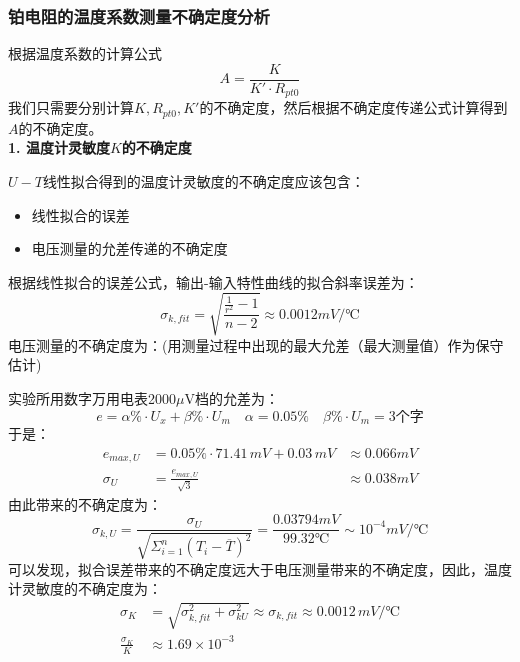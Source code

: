 \documentclass[12pt]{article}
\begin{document}
\subsubsection{铂电阻的温度系数测量不确定度分析}
\quad 根据温度系数的计算公式
\[
    A=\frac{K}{K' \cdot R_{pt0}}
\]
\quad 我们只需要分别计算$K,R_{pt0},K'$的不确定度，然后根据不确定度传递公式计算得到$A$的不确定度。\\
\textbf{1. 温度计灵敏度$K$的不确定度} \\
\par 
$U-T$线性拟合得到的温度计灵敏度的不确定度应该包含：
\begin{itemize}
    \item 线性拟合的误差
    \item 电压测量的允差传递的不确定度
\end{itemize}
\quad 根据线性拟合的误差公式，输出-输入特性曲线的拟合斜率误差为：
\begin{equation*}
    \sigma_{k,fit} = \sqrt{\frac{\frac{1}{r^2}-1}{n-2}} \approx 0.0012 mV/\text{℃}
\end{equation*}
\quad 电压测量的不确定度为：(用测量过程中出现的最大允差（最大测量值）作为保守估计)\\
\par
 实验所用数字万用电表2000$\mu$V档的允差为：
\begin{equation*}
    e=\alpha\%\cdot U_{x} + \beta \% \cdot U_m \quad \alpha=0.05\% \quad \beta \% \cdot U_m=3\text{个字}
\end{equation*}
\quad 于是：
\begin{equation*}
\begin{aligned}
    e_{max,U} &= 0.05\%\cdot 71.41\,mV + 0.03\,mV &\approx 0.066 mV \\
    \sigma_{U} &= \frac{e_{max,U}}{\sqrt{3}} &\approx 0.038 mV 
\end{aligned}
\end{equation*}
\quad 由此带来的不确定度为：
\begin{equation*}
    \sigma_{k,U} = \frac{\sigma_{U}}{\sqrt{\Sigma_{i=1}^{n} (T_i-\overline T)^2}}= \frac{0.03794 mV}{99.32\text{℃}} \sim 10^{-4} mV/\text{℃}
\end{equation*}
\quad 可以发现，拟合误差带来的不确定度远大于电压测量带来的不确定度，因此，温度计灵敏度的不确定度为：
\begin{equation*}
\begin{aligned}
    \sigma_{K} &= \sqrt{\sigma_{k,fit}^2 + \sigma_{kU}^2} \approx \sigma_{k,fit} \approx0.0012\, mV/\text{℃} \\
    \frac {\sigma_{K}}{K} &\approx 1.69\times10^{-3}
\end{aligned}
\end{equation*}
\end{document}
